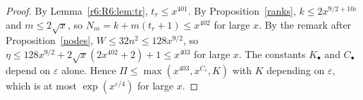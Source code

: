 \begin{proof}
By Lemma~\ref{r6:R6:lem:tr}, $t_r\le x^{401}$. By Proposition~\ref{ranks}, $k\le2x^{9/2+10\varepsilon}$ and $m\le2\sqrt x$, so $N_m=k+m(t_r+1)\le x^{402}$ for large $x$. By the remark after Proposition~\ref{nodes}, $W\le32n^2\le128x^{9/2}$, so $\eta\le128x^{9/2}+2\sqrt x(2x^{402}+2)+1\le x^{403}$ for large $x$. The constants $K_\bullet$ and $C_\bullet$ depend on $\varepsilon$ alone. Hence $\Pi\le\max(x^{403},x^{C_c},K)$ with $K$ depending on $\varepsilon$, which is at most $\exp(x^{\varepsilon/4})$ for large $x$.
\end{proof}

